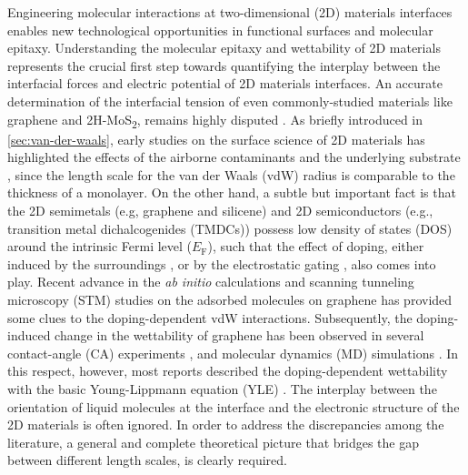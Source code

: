 Engineering molecular interactions at two-dimensional (2D) materials
interfaces enables new technological opportunities in functional
surfaces and molecular epitaxy.
%
Understanding the molecular epitaxy and wettability of 2D
materials represents the crucial first step towards quantifying the
interplay between the interfacial forces and electric potential of 2D
materials interfaces.
%
An accurate determination of the interfacial tension of even
commonly-studied materials like graphene and 2H-MoS\textsubscript{2},
remains highly disputed
\autocite{taherian2013what,Kozbial_2015_wetting_mos2,Parobek_2015_wetting_rev,Govind_Rajan_2016}.
%
As briefly introduced in \autoref{sec:van-der-waals}, early studies on
the surface science of 2D materials has highlighted the effects of the
airborne contaminants
\autocite{li_2013_airborne,Xu_2013_withwhat,Kozbial_study_2014_gr_wetting,Kozbial_2015_wetting_mos2,Chow_2015_wetting_WS2}
and the underlying substrate
\autocite{Raj_2013_wetting_rev,rafiee_2012_transparency,Shih_2012_prl,shih_2013_wetting_natmat},
since the length scale for the van der Waals (vdW) radius is
comparable to the thickness of a monolayer. On the other hand, a
subtle but important fact is that the 2D semimetals (e.g, graphene and
silicene) and 2D semiconductors (e.g., transition metal
dichalcogenides (TMDCs)) possess low density of states (DOS) around
the intrinsic Fermi level (\(E_{\mathrm{F}}\)), such that the effect
of doping, either induced by the surroundings
\autocite{Chen_2013_doping,Varchon_2007_elec_struc_gr_SiC,Giovannetti_2008_doping},
or by the electrostatic gating
\autocite{Das_2008_doping,Perera_2013_doping}, also comes into
play. Recent advance in the \textit{ab initio} calculations and
scanning tunneling microscopy (STM) studies on the adsorbed molecules
on graphene
\autocite{Muruganathan_2015_tunable_vdw_gr,Huttmann_2015_vdw_gr_doping}
has provided some clues to the doping-dependent vdW
interactions. Subsequently, the doping-induced change in the
wettability of graphene has been observed in several contact-angle (CA)
experiments
\autocite{Hong_2016_mechanism,goniszewski_correlation_2016,Ashraf_2016_doping},
and molecular dynamics (MD) simulations
\autocite{Ostrowski_2014_tunable,Ren_2015_interfacial,Taherian_2015_asym_EW,Daub_2007_nanoscale_EW}.
%
In this respect, however, most reports described the doping-dependent
wettability with the basic Young-Lippmann equation (YLE)
\autocite{Lippmann_1875_wetting}. The interplay between the orientation of
liquid molecules at the interface \autocite{Shen_2006_lifshitz_water} and
the electronic structure of the 2D materials is often ignored. In
order to address the discrepancies among the literature, a general and
complete theoretical picture that bridges the gap between different
length scales, is clearly required.


